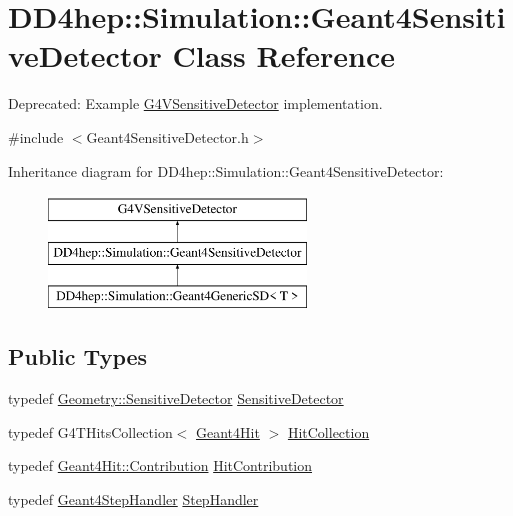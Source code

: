 \hypertarget{class_d_d4hep_1_1_simulation_1_1_geant4_sensitive_detector}{}\section{D\+D4hep\+:\+:Simulation\+:\+:Geant4\+Sensitive\+Detector Class Reference}
\label{class_d_d4hep_1_1_simulation_1_1_geant4_sensitive_detector}


Deprecated\+: Example \hyperlink{class_g4_v_sensitive_detector}{G4\+V\+Sensitive\+Detector} implementation.  




{\ttfamily \#include $<$Geant4\+Sensitive\+Detector.\+h$>$}

Inheritance diagram for D\+D4hep\+:\+:Simulation\+:\+:Geant4\+Sensitive\+Detector\+:\begin{figure}[H]
\begin{center}
\leavevmode
\includegraphics[height=3.000000cm]{class_d_d4hep_1_1_simulation_1_1_geant4_sensitive_detector}
\end{center}
\end{figure}
\subsection*{Public Types}
\begin{DoxyCompactItemize}
\item 
typedef \hyperlink{class_d_d4hep_1_1_geometry_1_1_sensitive_detector}{Geometry\+::\+Sensitive\+Detector} \hyperlink{class_d_d4hep_1_1_simulation_1_1_geant4_sensitive_detector_a6375f9a4f776b531e443483ff9fa8c28}{Sensitive\+Detector}
\item 
typedef G4\+T\+Hits\+Collection$<$ \hyperlink{class_d_d4hep_1_1_simulation_1_1_geant4_hit}{Geant4\+Hit} $>$ \hyperlink{class_d_d4hep_1_1_simulation_1_1_geant4_sensitive_detector_a4865cf9c96edfef8cd41e309a4cd6211}{Hit\+Collection}
\item 
typedef \hyperlink{class_d_d4hep_1_1_simulation_1_1_geant4_hit_a03a5270c4d1410302fe278ce6a47f268}{Geant4\+Hit\+::\+Contribution} \hyperlink{class_d_d4hep_1_1_simulation_1_1_geant4_sensitive_detector_a82e16b04c44370489f88b1e6a1ef2ab0}{Hit\+Contribution}
\item 
typedef \hyperlink{class_d_d4hep_1_1_simulation_1_1_geant4_step_handler}{Geant4\+Step\+Handler} \hyperlink{class_d_d4hep_1_1_simulation_1_1_geant4_sensitive_detector_ad8f31d0680aa437d6eb7242292e50a15}{Step\+Handler}
\end{DoxyCompactItemize}
